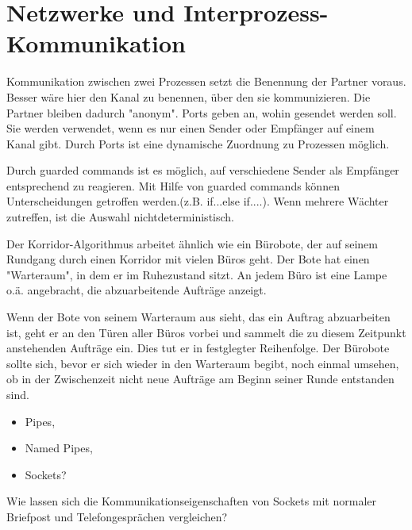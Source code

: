 \section{Netzwerke und Interprozess-Kommunikation}

\begin{answer}
Kommunikation zwischen zwei Prozessen setzt die Benennung der Partner voraus. Besser wäre hier den Kanal zu benennen, über den sie kommunizieren. Die Partner bleiben dadurch "anonym". Ports geben an, wohin gesendet werden soll. Sie werden verwendet, wenn es nur einen Sender oder Empfänger auf einem Kanal gibt. Durch Ports ist eine dynamische Zuordnung zu Prozessen möglich.
\end{answer}

\begin{answer}
Durch guarded commands ist es möglich, auf verschiedene Sender als Empfänger entsprechend
zu reagieren. Mit Hilfe von guarded commands können Unterscheidungen getroffen werden.(z.B.
if...else if....).
Wenn mehrere Wächter zutreffen, ist die Auswahl nichtdeterministisch.
\end{answer}

\begin{answer}
Der Korridor-Algorithmus arbeitet ähnlich wie ein Bürobote, der auf seinem Rundgang durch einen Korridor mit vielen Büros geht. Der Bote hat einen "Warteraum", in dem er im Ruhezustand sitzt. An jedem Büro ist eine Lampe o.ä. angebracht, die abzuarbeitende Aufträge anzeigt.

Wenn der Bote von seinem Warteraum aus sieht, das ein Auftrag abzuarbeiten ist, geht er an den Türen aller Büros vorbei und sammelt die zu diesem Zeitpunkt anstehenden Aufträge ein. Dies tut er in festglegter Reihenfolge. Der Bürobote sollte sich, bevor er sich wieder in den Warteraum begibt, noch einmal umsehen, ob in der Zwischenzeit nicht neue Aufträge am Beginn seiner Runde entstanden sind.
\end{answer}

\begin{multilinequestion}
\begin{itemize}
\item Pipes,
\item Named Pipes,
\item Sockets?
\end{itemize}

Wie lassen sich die Kommunikationseigenschaften von Sockets mit normaler Briefpost und Telefongesprächen vergleichen?
\end{multilinequestion}

